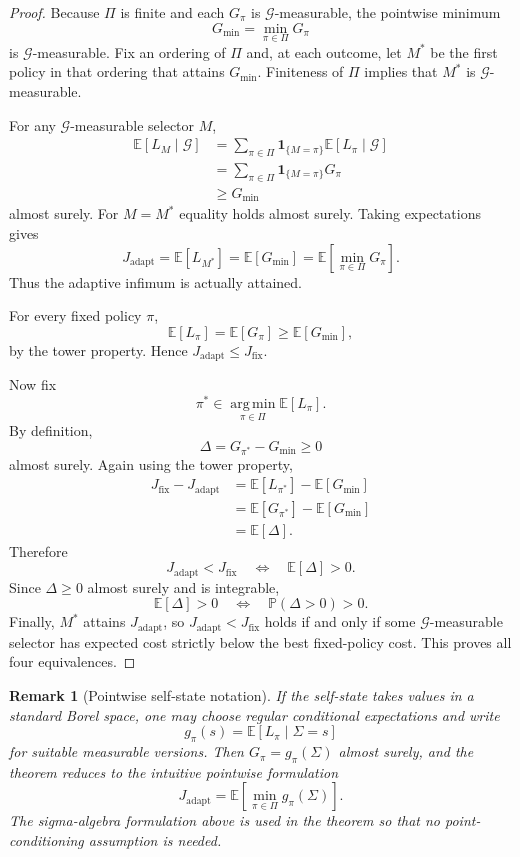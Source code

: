 \documentclass[11pt]{article}
\newtheorem{remark}{Remark}
\begin{document}
\begin{proof}
Because $\Pi$ is finite and each $G_\pi$ is $\mathcal{G}$-measurable, the pointwise minimum
\[
  G_{\min}=\min_{\pi\in\Pi}G_\pi
\]
is $\mathcal{G}$-measurable. Fix an ordering of $\Pi$ and, at each outcome, let $M^*$ be the first policy in that ordering that attains $G_{\min}$. Finiteness of $\Pi$ implies that $M^*$ is $\mathcal{G}$-measurable.

For any $\mathcal{G}$-measurable selector $M$,
\begin{align*}
  \mathbb{E}[L_M\mid\mathcal{G}]
  &=\sum_{\pi\in\Pi}\mathbf{1}_{\{M=\pi\}}
    \mathbb{E}[L_\pi\mid\mathcal{G}]\\
  &=\sum_{\pi\in\Pi}\mathbf{1}_{\{M=\pi\}}G_\pi\\
  &\ge G_{\min}
\end{align*}
almost surely. For $M=M^*$ equality holds almost surely. Taking expectations gives
\[
  J_{\mathrm{adapt}}
  =\mathbb{E}[L_{M^*}]
  =\mathbb{E}[G_{\min}]
  =\mathbb{E}\!\left[\min_{\pi\in\Pi}G_\pi\right].
\]
Thus the adaptive infimum is actually attained.

For every fixed policy $\pi$,
\[
  \mathbb{E}[L_\pi]
  =\mathbb{E}[G_\pi]
  \ge\mathbb{E}[G_{\min}],
\]
by the tower property. Hence $J_{\mathrm{adapt}}\le J_{\mathrm{fix}}$.

Now fix
\[
  \pi^*\in\operatorname*{arg\,min}_{\pi\in\Pi}\mathbb{E}[L_\pi].
\]
By definition,
\[
  \Delta=G_{\pi^*}-G_{\min}\ge 0
\]
almost surely. Again using the tower property,
\begin{align*}
  J_{\mathrm{fix}}-J_{\mathrm{adapt}}
  &=\mathbb{E}[L_{\pi^*}]-\mathbb{E}[G_{\min}]\\
  &=\mathbb{E}[G_{\pi^*}]-\mathbb{E}[G_{\min}]\\
  &=\mathbb{E}[\Delta].
\end{align*}
Therefore
\[
  J_{\mathrm{adapt}}<J_{\mathrm{fix}}
  \quad\Longleftrightarrow\quad
  \mathbb{E}[\Delta]>0.
\]
Since $\Delta\ge 0$ almost surely and is integrable,
\[
  \mathbb{E}[\Delta]>0
  \quad\Longleftrightarrow\quad
  \mathbb{P}(\Delta>0)>0.
\]
Finally, $M^*$ attains $J_{\mathrm{adapt}}$, so
$J_{\mathrm{adapt}}<J_{\mathrm{fix}}$ holds if and only if some $\mathcal{G}$-measurable selector has expected cost strictly below the best fixed-policy cost. This proves all four equivalences.
\end{proof}

\begin{remark}[Pointwise self-state notation]
If the self-state takes values in a standard Borel space, one may choose regular conditional expectations and write
\[
  g_\pi(s)=\mathbb{E}[L_\pi\mid\Sigma=s]
\]
for suitable measurable versions. Then $G_\pi=g_\pi(\Sigma)$ almost surely, and the theorem reduces to the intuitive pointwise formulation
\[
  J_{\mathrm{adapt}}
  =\mathbb{E}\!\left[\min_{\pi\in\Pi}g_\pi(\Sigma)\right].
\]
The sigma-algebra formulation above is used in the theorem so that no point-conditioning assumption is needed.
\end{remark}
\end{document}
